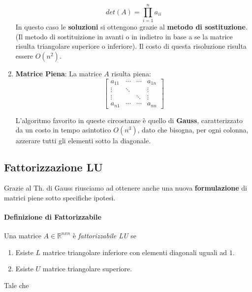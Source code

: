 \documentclass{article}
\begin{document}
\begin{enumerate}
\[    \]
    \vspace*{5px}
    \[ det(A) = \prod_{i=1}^{n} a_{ii} \]
    \vspace*{5px}
    In questo caso le \textbf{soluzioni} si ottengono grazie al \textbf{metodo di sostituzione}. (Il metodo di sostituizione in avanti o in indietro in base a se la matrice risulta triangolare superiore o inferiore). Il costo di questa risoluzione risulta essere $O(n^{2})$.
    \item \textbf{Matrice Piena}: La matrice $A$ risulta piena:
    \[
    \begin{bmatrix}
        a_{11} & \cdots & \cdots  & a_{1n} \\
        \vdots & \ddots &  & \vdots \\
            \vdots &  & \ddots &  \vdots \\
            a_{n1} & \cdots & \cdots & a_{nn}
    \end{bmatrix} 
    \]

    L'algoritmo favorito in queste circostanze è quello di \textbf{Gauss}, caratterizzato da un costo in tempo asintotico $O(n^{3})$, dato che bisogna, per ogni colonna, azzerare tutti gli elementi sotto la diagonale.
    
\end{enumerate}

\newpage

\subsection{Fattorizzazione LU}

Grazie al Th. di Gauss riusciamo ad ottenere anche una nuova \textbf{formulazione} di matrici piene sotto specifiche ipotesi.

\paragraph{Definizione di Fattorizzabile} Una matrice $A \in \mathbb{R}^{nxn}$ è \textit{fattorizzabile LU} se

\begin{enumerate}
    \item Esiste $L$ matrice triangolare inferiore con elementi diagonali uguali ad $1$.
    \item Esiste $U$ matrice triangolare superiore.
\end{enumerate}

Tale che

\vspace*{-8px}
\end{document}
